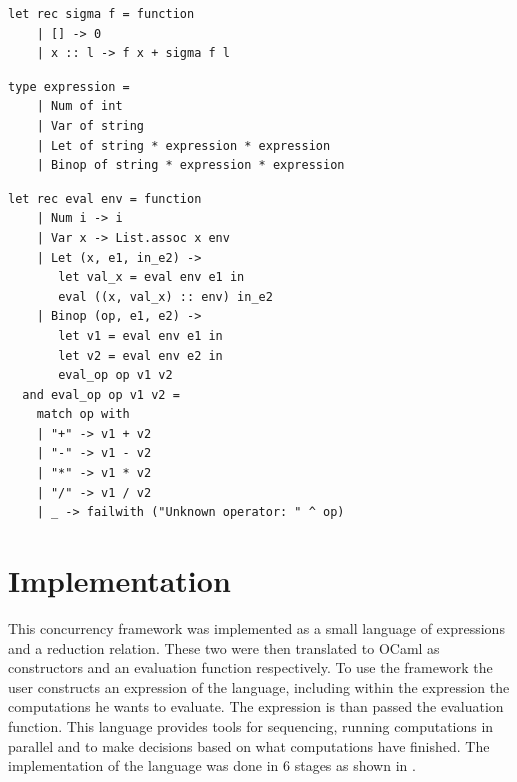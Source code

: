 \documentclass[12pt,twoside,notitlepage]{report}
\begin{document}
\begin{minipage}{\linewidth}

\begin{lstlisting}[caption={OCaml higher order functions example}]
let rec sigma f = function
    | [] -> 0
    | x :: l -> f x + sigma f l
\end{lstlisting}

\end{minipage}
    
\begin{minipage}{\linewidth}

\begin{lstlisting}[caption={OCaml data structure example}]
type expression =
    | Num of int
    | Var of string
    | Let of string * expression * expression
    | Binop of string * expression * expression
\end{lstlisting}

\end{minipage}
    
\begin{minipage}{\linewidth}

\begin{lstlisting}[caption={OCaml evaluation function example}]    
let rec eval env = function
    | Num i -> i
    | Var x -> List.assoc x env
    | Let (x, e1, in_e2) ->
       let val_x = eval env e1 in
       eval ((x, val_x) :: env) in_e2
    | Binop (op, e1, e2) ->
       let v1 = eval env e1 in
       let v2 = eval env e2 in
       eval_op op v1 v2
  and eval_op op v1 v2 =
    match op with
    | "+" -> v1 + v2
    | "-" -> v1 - v2
    | "*" -> v1 * v2
    | "/" -> v1 / v2
    | _ -> failwith ("Unknown operator: " ^ op)
\end{lstlisting}

\end{minipage}



\cleardoublepage
\chapter{Implementation}
This concurrency framework was implemented as a small language of expressions and a reduction relation. These two were then translated to OCaml as constructors and an evaluation function respectively. To use the framework the user constructs an expression of the language, including within the expression the computations he wants to evaluate. The expression is than passed the evaluation function.  This language provides tools for sequencing, running computations in parallel and to make decisions based on what computations have finished. The implementation of the language was done in 6 stages as shown in . 
\end{document}
